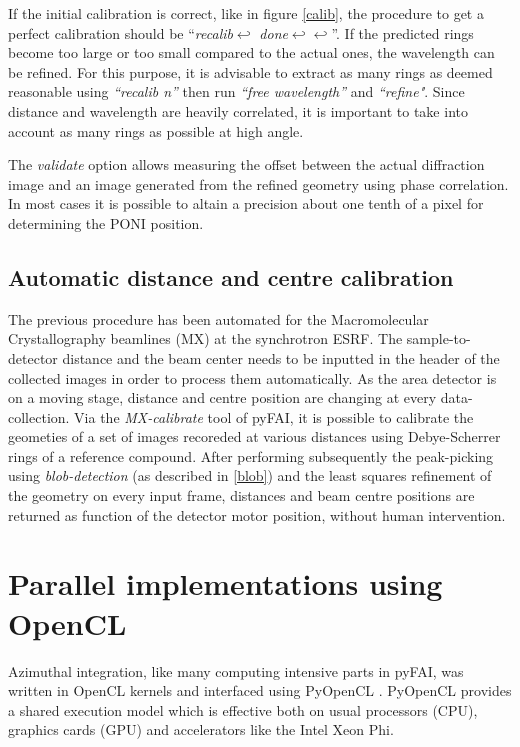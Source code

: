 \documentclass[preprint]{iucr}
\begin{document}
If the initial calibration is correct, like in figure \ref{calib}, the procedure
to get a perfect calibration should be ``\textit{recalib}$\hookleftarrow $
\textit{done}$\hookleftarrow \hookleftarrow $''.
If the predicted rings become too large or too small compared
to the actual ones, the wavelength can be refined.
For this purpose, it is advisable to  extract as many rings as
deemed reasonable using \textit{``recalib n''} then run \textit{``free wavelength''} and
\textit{``refine"}.%
Since distance and wavelength are
heavily correlated, it is important to take into account as many rings as
possible at high angle.

The \textit{validate} option allows measuring the offset between the actual
diffraction image and an image generated from the refined geometry using phase
correlation.
In most cases it is possible to altain a precision about one tenth of a pixel
for determining the PONI position.

\subsection{Automatic distance and centre calibration}
The previous procedure has been automated for the  Macromolecular
Crystallography beamlines (MX) at the synchrotron ESRF.
The sample-to-detector distance and the beam center needs to be inputted in the
header of the collected images in order to process them automatically.
As the area detector is on a moving stage, distance and centre position are
changing at every data-collection.
Via the \textit{MX-calibrate} tool of pyFAI, it is possible to calibrate the
geometies of a set of images recoreded at various distances using Debye-Scherrer
rings of a reference compound.
After performing subsequently the peak-picking using \textit{blob-detection}
(as described in \ref{blob}) and the least squares refinement of the geometry on
every input frame, distances and beam centre positions are returned as function
of the detector motor position, without human intervention.

\section{Parallel implementations using OpenCL}
\label{annex_opencl}
Azimuthal integration, like  many computing intensive parts in pyFAI, was
written in OpenCL kernels and interfaced using PyOpenCL \cite{pyopencl}.
PyOpenCL provides a shared execution model which is effective both on
usual processors (CPU), graphics cards (GPU) and accelerators like the Intel
Xeon Phi.
\end{document}
